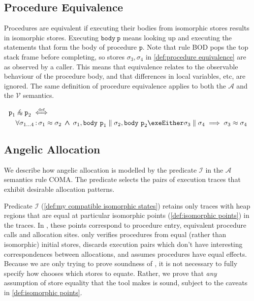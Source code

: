 \documentclass[runningheads,a4paper]{llncs}
\DeclareMathOperator{\band}{\bm{\;\land\;}}
\DeclareMathOperator{\suchthat}{:}
\newcommand*{\qvars}[2]{#1_{#2}}
\newcommand*{\defiff}{\stackrel{\text{\tiny def}}{\iff}}
\newcommand*{\sima}[1]{%
  \mathrel{\vcenter{\offinterlineskip
  \hbox{$\scriptscriptstyle\,\mathcal{#1}$}\vskip-.00ex\hbox{$\sim$}\vskip-.35ex\hbox{$\sim$}}}}
\newcommand*\iso{\approx}
\newcommand*\isol{\sima{L}}
\newcommand*{\parcomp}{\parallel}
\newcommand*\Asemantics{\mathcal{A}}
\newcommand*\asemantics{$\Asemantics$ semantics}
\newcommand*\Vsemantics{\mathcal{V}}
\newcommand*{\composeRuleAbstract}{\textnormal{COMA}}
\newcommand*{\bodyRule}{\textnormal{BOD}}
\newcommand*{\body}{\mathtt{body}}
\newcommand*{\fun}{\texttt{p}}
\newcommand*{\isoR}{\mathcal{I}}
\newcommand*{\store}{\sigma}
\begin{document}
\subsection{Procedure Equivalence}

Procedures are equivalent if executing their bodies from isomorphic stores results in isomorphic stores. Executing $\body~\fun$ means looking up and executing the statements that form the body of procedure $\fun$. Note that rule \bodyRule{} pops the top stack frame before completing, so stores $\store_3,\store_4$ in \cref{def:procedure equivalence} are as observed by a caller. This means that equivalence relates to the observable behaviour of the procedure body, and that differences in local variables, etc, are ignored. The same definition of procedure equivalence applies to both the $\Asemantics$ and the $\Vsemantics$ semantics.
 
\begin{definition}\label{def:procedure equivalence}\setlength{\parindent}{0cm}
\[\begin{aligned}
&\fun_1 \isol \fun_2 \defiff \\
&\quad\forall \qvars{\store}{1 \ldots 4} \suchthat
	\store_1 \iso \store_2 \band 
        \store_1,\body~\fun_1 \parcomp \store_2,\body~\fun_2 \exeEither \store_3 \parcomp \store_4
	\implies 
	\store_3 \iso \store_4
\end{aligned}\]
\end{definition}

\subsection{Angelic Allocation}

We describe how angelic allocation is modelled by the predicate $\isoR$ in the \asemantics{} rule \composeRuleAbstract{}. The predicate selects the pairs of execution traces that exhibit desirable allocation patterns. 
 
Predicate $\isoR$ (\cref{def:my compatible isomorphic states}) retains only traces with heap regions that are equal at particular isomorphic points (\cref{def:isomorphic points}) in the traces. In \tool{}, these points correspond to procedure entry, equivalent procedure calls and allocation sites. \tool{} only verifies procedures from equal (rather than isomorphic) initial stores, discards execution pairs which don't have interesting correspondences between allocations, and assumes procedures have equal effects. Because we are only trying to prove soundness of \metho{}, it is not necessary to fully specify how \tool{} chooses which stores to equate. Rather, we prove that \emph{any} assumption of store equality that the tool makes is sound, subject to the caveats in \cref{def:isomorphic points}. 
\end{document}
